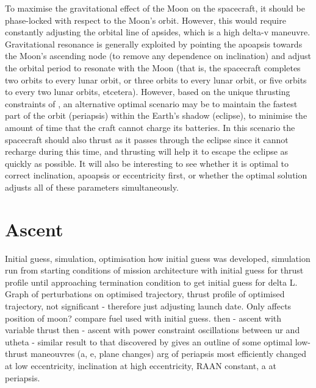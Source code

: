 To maximise the gravitational effect of the Moon on the spacecraft, it should be phase-locked with respect to the Moon's orbit. However, this would require constantly adjusting the orbital line of apsides, which is a high delta-v maneuvre. Gravitational resonance is generally exploited by pointing the apoapsis towards the Moon's ascending node (to remove any dependence on inclination) and adjust the orbital period to resonate with the Moon (that is, the spacecraft completes two orbits to every lunar orbit, or three orbits to every lunar orbit, or five orbits to every two lunar orbits, etcetera). However, based on the unique thrusting constraints of \BW, an alternative optimal scenario may be to maintain the fastest part of the orbit (periapsis) within the Earth's shadow (eclipse), to minimise the amount of time that the craft cannot charge its batteries. In this scenario the spacecraft should also thrust as it passes through the eclipse since it cannot recharge during this time, and thrusting will help it to escape the eclipse as quickly as possible. It will also be interesting to see whether it is optimal to correct inclination, apoapsis or eccentricity first, or whether the optimal solution adjusts all of these parameters simultaneously.
 
 

\section{Ascent} Initial guess, simulation, optimisation
how initial guess was developed, simulation run from starting conditions of mission architecture with initial guess for thrust profile until approaching termination condition to get initial guess for delta L. Graph of perturbations on optimised trajectory, thrust profile of optimised trajectory, not significant - therefore just adjusting launch date. Only affects position of moon?
compare fuel used with initial guess.
then - ascent with variable thrust
then - ascent with power constraint
oscillations between ur and utheta - similar result to that discovered by \textcite{Betts2003}
\textcite{Edelbaum1964} gives an outline of some optimal low-thrust maneouvres (a, e, plane changes)
arg of periapsis most efficiently changed at low eccentricity, inclination at high eccentricity, RAAN constant, a at periapsis.

